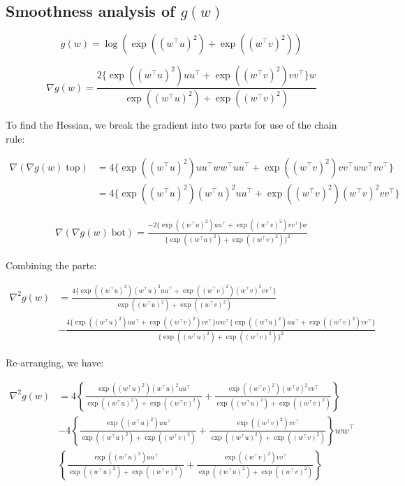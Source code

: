 \documentclass[11pt]{article}
\begin{document}
\subsection{Smoothness analysis of $g(w)$}

\begin{equation}
    g(w) = \log( \exp((w^{\top}u)^2) + \exp((w^{\top}v)^2) )
\end{equation}

\begin{equation}
    \nabla g(w) 
    = \frac{ 2 \{ \exp((w^{\top}u)^2)uu^{\top} + \exp((w^{\top}v)^2)vv^{\top}  \} w}{ \exp((w^{\top}u)^2) + \exp((w^{\top}v)^2) }
\end{equation}

To find the Hessian, we break the gradient into two parts for use of the chain rule:

\begin{align*}
    \nabla (\nabla g(w) \; \textrm{top}) 
    &= 4 \{ \exp((w^{\top}u)^2)uu^{\top}ww^{\top}uu^{\top} + \exp((w^{\top}v)^2)vv^{\top}ww^{\top}vv^{\top} \} \\
    &= 4 \{ \exp((w^{\top}u)^2)(w^{\top}u)^2 uu^{\top} + \exp((w^{\top}v)^2)(w^{\top}v)^2 vv^{\top} \}
\end{align*}

\begin{align*}
    \nabla (\nabla g(w) \; \textrm{bot}) = \frac{ -2 \{ \exp((w^{\top}u)^2)uu^{\top} + \exp((w^{\top}v)^2)vv^{\top} \} w }{ \{ \exp((w^{\top}u)^2) + \exp((w^{\top}v)^2) \}^2 }
\end{align*}

Combining the parts:

\begin{align*}
    \nabla^2 g(w) &= 
    \frac{ 4 \{ \exp((w^{\top}u)^2)(w^{\top}u)^2 uu^{\top} + \exp((w^{\top}v)^2)(w^{\top}v)^2 vv^{\top} \} }{ \exp((w^{\top}u)^2) + \exp((w^{\top}v)^2)  } \\
    &- \frac{ 4 \{ \exp((w^{\top}u)^2)uu^{\top} + \exp((w^{\top}v)^2)vv^{\top}  \} ww^{\top} \{ \exp((w^{\top}u)^2)uu^{\top} + \exp((w^{\top}v)^2)vv^{\top}  \} }{ \{ \exp((w^{\top}u)^2) + \exp((w^{\top}v)^2) \}^2 }
\end{align*}

Re-arranging, we have:

\begin{align*}
    \nabla^2 g(w) &= 
    4 \left\{ \frac{  \exp((w^{\top}u)^2)(w^{\top}u)^2 uu^{\top}  }{ \exp((w^{\top}u)^2) + \exp((w^{\top}v)^2)  } +
    \frac{  \exp((w^{\top}v)^2)(w^{\top}v)^2 vv^{\top}  }{ \exp((w^{\top}u)^2) + \exp((w^{\top}v)^2)  } \right\} \\
    &- 4 \left\{
    \frac{  \exp((w^{\top}u)^2) uu^{\top}  }{ \exp((w^{\top}u)^2) + \exp((w^{\top}v)^2)  } + \frac{  \exp((w^{\top}v)^2) vv^{\top}  }{ \exp((w^{\top}u)^2) + \exp((w^{\top}v)^2)  } \right\}
    ww^{\top} \\
     & \left\{ \frac{  \exp((w^{\top}u)^2) uu^{\top}  }{ \exp((w^{\top}u)^2) + \exp((w^{\top}v)^2)  } + \frac{  \exp((w^{\top}v)^2) vv^{\top}  }{ \exp((w^{\top}u)^2) + \exp((w^{\top}v)^2)  }
     \right\}
\end{align*}
\end{document}
